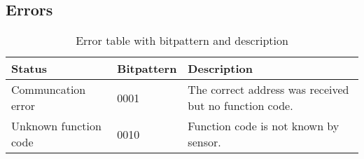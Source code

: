 \subsection{Errors}
\begin{table}[H]
\centering
\begin{tabular}{|l|l|l|}
	\hline
	Status & Bitpattern & Description \\ 
	\hline
	Communcation error 	& 0001  & The correct address was received but no function code. \\
	\hline
	Unknown function code  & 0010  & Function code is not known by sensor. \\
	\hline
\end{tabular}
\caption{Error table with bitpattern and description}
\label{table:errortable}
\end{table}




